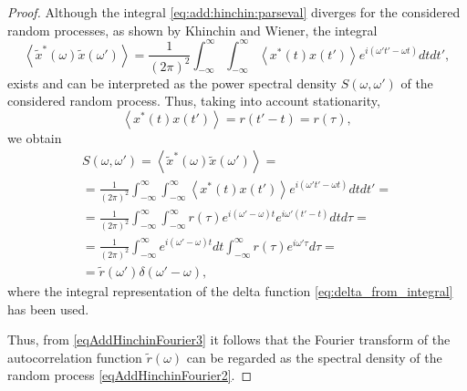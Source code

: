 \begin{theorem}
\begin{proof}
Although the integral \eqref{eq:add:hinchin:parseval} diverges for
the considered random processes, as shown by Khinchin and Wiener,
the integral
\begin{equation}
\left<\tilde{x}^{*}\left(\omega\right)\tilde{x}\left(\omega'\right)\right>
= 
\frac{1}{\left(2 \pi\right)^2}
\int_{-\infty}^{\infty}\int_{-\infty}^{\infty}\left<x^{*}\left(t\right)x\left(t'\right)\right>e^{i
  \left(\omega' t' - \omega t\right)}dtdt',
\label{eqAddHinchinFourier2}
\end{equation}
exists and can be interpreted as the power spectral density $S\left(\omega,\omega'\right)$
of the considered random process. Thus, taking into account stationarity,
\[
\left<x^{*}\left(t\right)x\left(t'\right)\right> = r\left(t' - t\right) = r\left(\tau\right),
\]
we obtain
\begin{eqnarray}
S\left(\omega, \omega'\right) =
\left<\tilde{x}^{*}\left(\omega\right)\tilde{x}\left(\omega'\right)\right>
= 
\nonumber \\
=
\frac{1}{\left(2 \pi\right)^2}
\int_{-\infty}^{\infty}\int_{-\infty}^{\infty}\left<x^{*}\left(t\right)x\left(t'\right)\right>e^{i
  \left(\omega' t' - \omega t\right)}dtdt' =
\nonumber \\
=
\frac{1}{\left(2 \pi\right)^2}
\int_{-\infty}^{\infty}\int_{-\infty}^{\infty}
r\left(\tau\right)
e^{i\left(\omega' - \omega\right) t}
e^{i\omega'\left(t' - t\right) }
dtd\tau =
\nonumber \\
=
\frac{1}{\left(2 \pi\right)^2}
\int_{-\infty}^{\infty}
e^{i \left(\omega' - \omega\right) t}dt 
\int_{-\infty}^{\infty}r\left(\tau\right)
e^{i \omega' \tau}d\tau =
\nonumber \\
= \tilde{r}\left(\omega'\right)\delta\left(\omega' - \omega\right),
\label{eqAddHinchinFourier3}
\end{eqnarray}
where the integral representation of the delta function
\eqref{eq:delta_from_integral} has been used.

Thus, from \eqref{eqAddHinchinFourier3} it follows that the Fourier transform
of the autocorrelation function $\tilde{r}\left(\omega\right)$ can
be regarded as the spectral density of the random process
\eqref{eqAddHinchinFourier2}. 
\end{proof}
\end{theorem}